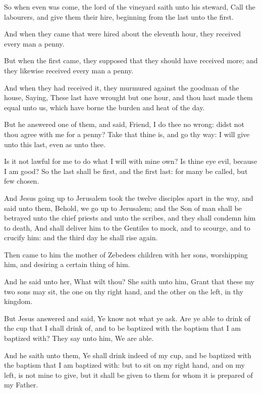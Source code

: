 \verse So when even was come, the lord of the vineyard saith unto his steward, Call the labourers, and give them their hire, beginning from the last unto the first.

\verse And when they came that were hired about the eleventh hour, they received every man a penny.

\verse But when the first came, they supposed that they should have received more; and they likewise received every man a penny.

\verse And when they had received it, they murmured against the goodman of the house, \verse Saying, These last have wrought but one hour, and thou hast made them equal unto us, which have borne the burden and heat of the day.

\verse But he answered one of them, and said, Friend, I do thee no wrong: didst not thou agree with me for a penny?  \verse Take that thine is, and go thy way: I will give unto this last, even as unto thee.

\verse Is it not lawful for me to do what I will with mine own? Is thine eye evil, because I am good?  \verse So the last shall be first, and the first last: for many be called, but few chosen.

\verse And Jesus going up to Jerusalem took the twelve disciples apart in the way, and said unto them, \verse Behold, we go up to Jerusalem; and the Son of man shall be betrayed unto the chief priests and unto the scribes, and they shall condemn him to death, \verse And shall deliver him to the Gentiles to mock, and to scourge, and to crucify him: and the third day he shall rise again.

\verse Then came to him the mother of Zebedees children with her sons, worshipping him, and desiring a certain thing of him.

\verse And he said unto her, What wilt thou? She saith unto him, Grant that these my two sons may sit, the one on thy right hand, and the other on the left, in thy kingdom.

\verse But Jesus answered and said, Ye know not what ye ask. Are ye able to drink of the cup that I shall drink of, and to be baptized with the baptism that I am baptized with? They say unto him, We are able.

\verse And he saith unto them, Ye shall drink indeed of my cup, and be baptized with the baptism that I am baptized with: but to sit on my right hand, and on my left, is not mine to give, but it shall be given to them for whom it is prepared of my Father.

